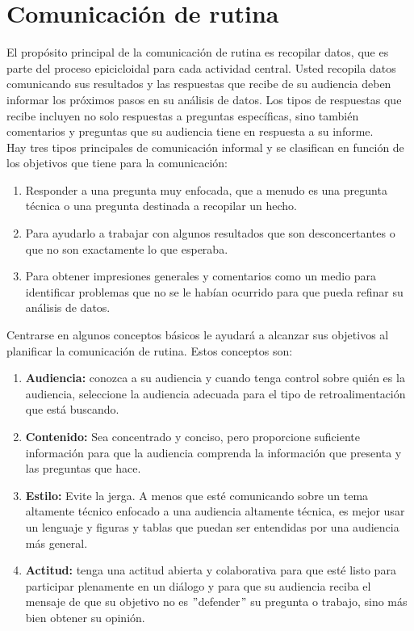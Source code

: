 \documentclass[10pt]{book}
\begin{document}
    \section{Comunicación de rutina}
    El propósito principal de la comunicación de rutina es recopilar datos, que es parte del proceso epicicloidal para cada actividad central. Usted recopila datos comunicando sus resultados y las respuestas que recibe de su audiencia deben informar los próximos pasos en su análisis de datos. Los tipos de respuestas que recibe incluyen no solo respuestas a preguntas específicas, sino también comentarios y preguntas que su audiencia tiene en respuesta a su informe. \\
    Hay tres tipos principales de comunicación informal y se clasifican en función de los objetivos que tiene para la comunicación:
    \begin{enumerate}[\bfseries 1.]
	\item  Responder a una pregunta muy enfocada, que a menudo es una pregunta técnica o una pregunta destinada a recopilar un hecho.
	\item Para ayudarlo a trabajar con algunos resultados que son desconcertantes o que no son exactamente lo que esperaba.
	\item Para obtener impresiones generales y comentarios como un medio para identificar problemas que no se le habían ocurrido para que pueda refinar su análisis de datos.
    \end{enumerate}
    Centrarse en algunos conceptos básicos le ayudará a alcanzar sus objetivos al planificar la comunicación de rutina. Estos conceptos son:
    \begin{enumerate}[\bfseries 1.]
	\item \textbf{Audiencia:} conozca a su audiencia y cuando tenga control sobre quién es la audiencia, seleccione la audiencia adecuada para el tipo de retroalimentación que está buscando.
	\item \textbf{Contenido:} Sea concentrado y conciso, pero proporcione suficiente información para que la audiencia comprenda la información que presenta y las preguntas que hace.
	\item \textbf{Estilo:} Evite la jerga. A menos que esté comunicando sobre un tema altamente técnico enfocado a una audiencia altamente técnica, es mejor usar un lenguaje y figuras y tablas que puedan ser entendidas por una audiencia más general.
	\item \textbf{Actitud:} tenga una actitud abierta y colaborativa para que esté listo para participar plenamente en un diálogo y para que su audiencia reciba el mensaje de que su objetivo no es $"$defender$"$ su pregunta o trabajo, sino más bien obtener su opinión.
    \end{enumerate}
\end{document}

